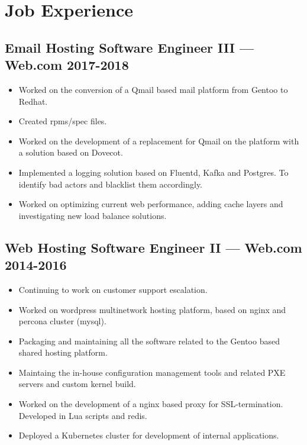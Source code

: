 \documentclass[11pt]{article}
\begin{document}
\section{Job Experience}


\subsection{Email Hosting Software Engineer III --- Web.com \hfill 2017-2018}
\begin{itemize}
  \setlength{\parskip}{0pt}
  \setlength{\itemsep}{0pt plus 1pt}
\item Worked on the conversion of a Qmail based mail platform from Gentoo to Redhat.
\item Created rpms/spec files.
\item Worked on the development of a replacement for Qmail on the platform with a solution based on Dovecot.
\item Implemented a logging solution based on Fluentd, Kafka and Postgres. To identify bad actors and blacklist them accordingly.
\item Worked on optimizing current web performance, adding cache layers and investigating new load balance solutions.
\end{itemize}

\subsection{Web Hosting Software Engineer II --- Web.com \hfill 2014-2016}
\begin{itemize}
  \setlength{\parskip}{0pt}
  \setlength{\itemsep}{0pt plus 1pt}
\item Continuing to work on customer support escalation.
\item Worked on wordpress multinetwork hosting platform, based on nginx and percona cluster (mysql).
\item Packaging and maintaining all the software related to the Gentoo based shared hosting platform.
\item Maintaing the in-house configuration management tools and related PXE servers and custom kernel build.
\item Worked on the development of a nginx based proxy for SSL-termination. Developed in Lua scripts and redis.
\item Deployed a Kubernetes cluster for development of internal applications.
\end{itemize}
\end{document}
